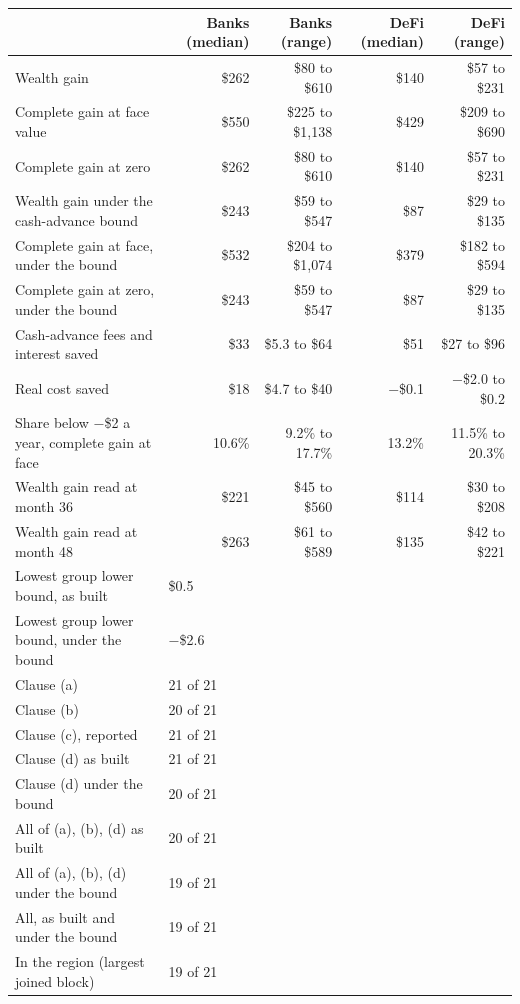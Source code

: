 \begin{tabular}{lrrrr}
\toprule
 & Banks (median) & Banks (range) & DeFi (median) & DeFi (range) \\
\midrule
Wealth gain & \$262 & \$80 to \$610 & \$140 & \$57 to \$231 \\
Complete gain at face value & \$550 & \$225 to \$1{,}138 & \$429 & \$209 to \$690 \\
Complete gain at zero & \$262 & \$80 to \$610 & \$140 & \$57 to \$231 \\
Wealth gain under the cash-advance bound & \$243 & \$59 to \$547 & \$87 & \$29 to \$135 \\
Complete gain at face, under the bound & \$532 & \$204 to \$1{,}074 & \$379 & \$182 to \$594 \\
Complete gain at zero, under the bound & \$243 & \$59 to \$547 & \$87 & \$29 to \$135 \\
Cash-advance fees and interest saved & \$33 & \$5.3 to \$64 & \$51 & \$27 to \$96 \\
Real cost saved & \$18 & \$4.7 to \$40 & $-$\$0.1 & $-$\$2.0 to \$0.2 \\
Share below $-$\$2 a year, complete gain at face & 10.6\% & 9.2\% to 17.7\% & 13.2\% & 11.5\% to 20.3\% \\
Wealth gain read at month 36 & \$221 & \$45 to \$560 & \$114 & \$30 to \$208 \\
Wealth gain read at month 48 & \$263 & \$61 to \$589 & \$135 & \$42 to \$221 \\
\midrule
Lowest group lower bound, as built & \multicolumn{4}{l}{\$0.5} \\
Lowest group lower bound, under the bound & \multicolumn{4}{l}{$-$\$2.6} \\
\midrule
Clause (a) & \multicolumn{4}{l}{21 of 21} \\
Clause (b) & \multicolumn{4}{l}{20 of 21} \\
Clause (c), reported & \multicolumn{4}{l}{21 of 21} \\
Clause (d) as built & \multicolumn{4}{l}{21 of 21} \\
Clause (d) under the bound & \multicolumn{4}{l}{20 of 21} \\
All of (a), (b), (d) as built & \multicolumn{4}{l}{20 of 21} \\
All of (a), (b), (d) under the bound & \multicolumn{4}{l}{19 of 21} \\
All, as built and under the bound & \multicolumn{4}{l}{19 of 21} \\
In the region (largest joined block) & \multicolumn{4}{l}{19 of 21} \\
\bottomrule
\end{tabular}
